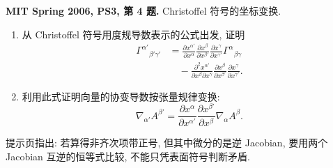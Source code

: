 \begin{exercise}
\textbf{MIT Spring 2006, PS3, 第 4 题.} Christoffel 符号的坐标变换.
\begin{enumerate}[label=(\alph*)]
\item 从 Christoffel 符号用度规导数表示的公式出发, 证明
\begin{equation*}
\begin{aligned}
 \Gamma^{\alpha'}{}_{\beta'\gamma'}
 &=\frac{\partial x^{\alpha'}}{\partial x^\alpha}
 \frac{\partial x^\beta}{\partial x^{\beta'}}
 \frac{\partial x^\gamma}{\partial x^{\gamma'}}\Gamma^\alpha{}_{\beta\gamma}\\
 &\quad-\frac{\partial^2x^{\alpha'}}{\partial x^\beta\partial x^\gamma}
 \frac{\partial x^\beta}{\partial x^{\beta'}}
 \frac{\partial x^\gamma}{\partial x^{\gamma'}}.
\end{aligned}
\end{equation*}
\item 利用此式证明向量的协变导数按张量规律变换:
\[
 \nabla_{\alpha'}A^{\beta'}=
 \frac{\partial x^\alpha}{\partial x^{\alpha'}}
 \frac{\partial x^{\beta'}}{\partial x^\beta}\nabla_\alpha A^\beta.
\]
\end{enumerate}
提示页指出: 若算得非齐次项带正号, 但其中微分的是逆 Jacobian, 要用两个 Jacobian 互逆的恒等式比较, 不能只凭表面符号判断矛盾.
\end{exercise}
